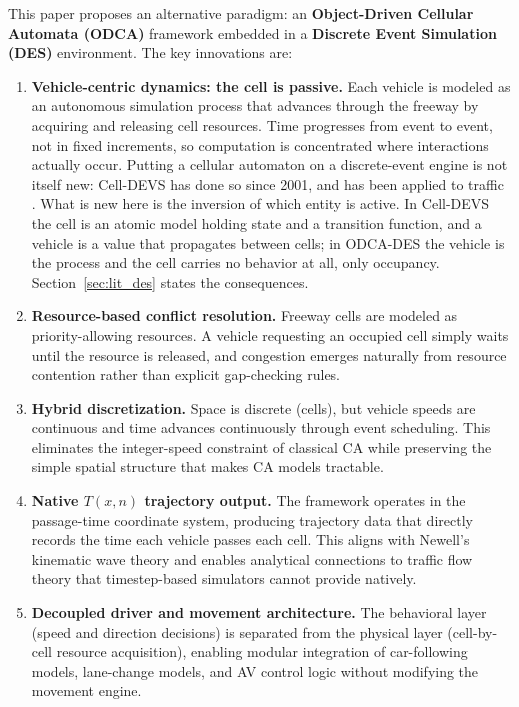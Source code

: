 \documentclass[review,number]{elsarticle}
\begin{document}
This paper proposes an alternative paradigm: an \textbf{Object-Driven Cellular Automata (ODCA)} framework embedded in a \textbf{Discrete Event Simulation (DES)} environment. The key innovations are:

\begin{enumerate}
    \item \textbf{Vehicle-centric dynamics: the cell is passive.} Each vehicle is modeled as an autonomous simulation process that advances through the freeway by acquiring and releasing cell resources. Time progresses from event to event, not in fixed increments, so computation is concentrated where interactions actually occur. Putting a cellular automaton on a discrete-event engine is not itself new: Cell-DEVS \citep{wainer2001timed,wainer2014cellular} has done so since 2001, and has been applied to traffic \citep{davidson2000specifying,wainer2006atlas}. What is new here is the inversion of which entity is active. In Cell-DEVS the cell is an atomic model holding state and a transition function, and a vehicle is a value that propagates between cells; in ODCA-DES the vehicle is the process and the cell carries no behavior at all, only occupancy. Section~\ref{sec:lit_des} states the consequences.

    \item \textbf{Resource-based conflict resolution.} Freeway cells are modeled as priority-allowing resources. A vehicle requesting an occupied cell simply waits until the resource is released, and congestion emerges naturally from resource contention rather than explicit gap-checking rules.

    \item \textbf{Hybrid discretization.} Space is discrete (cells), but vehicle speeds are continuous and time advances continuously through event scheduling. This eliminates the integer-speed constraint of classical CA while preserving the simple spatial structure that makes CA models tractable.

    \item \textbf{Native $T(x,n)$ trajectory output.} The framework operates in the passage-time coordinate system, producing trajectory data that directly records the time each vehicle passes each cell. This aligns with Newell's kinematic wave theory \citep{newell1993simplified} and enables analytical connections to traffic flow theory that timestep-based simulators cannot provide natively.

    \item \textbf{Decoupled driver and movement architecture.} The behavioral layer (speed and direction decisions) is separated from the physical layer (cell-by-cell resource acquisition), enabling modular integration of car-following models, lane-change models, and AV control logic without modifying the movement engine.


\end{enumerate}
\end{document}
